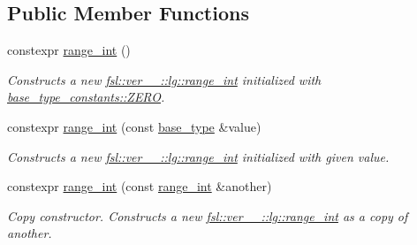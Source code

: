 \subsection*{Public Member Functions}
\begin{DoxyCompactItemize}
\item 
\mbox{\label{classfsl_1_1ver__1__0_1_1lg_1_1range__int_acab1d8507d2ee32ae77216e4900b8ff0}} 
constexpr \mbox{\hyperlink{classfsl_1_1ver__1__0_1_1lg_1_1range__int_acab1d8507d2ee32ae77216e4900b8ff0}{range\+\_\+int}} ()
\begin{DoxyCompactList}\small\item\em Constructs a new \mbox{\hyperlink{classfsl_1_1ver__1__0_1_1lg_1_1range__int}{fsl\+::ver\+\_\+\_\+::lg\+::range\+\_\+int}} initialized with {\itshape \mbox{\hyperlink{structfsl_1_1ver__1__0_1_1lg_1_1range__int_1_1base__type__constants_ada13cd01546095bb61095888cd0ab41d}{base\+\_\+type\+\_\+constants\+::\+Z\+E\+RO}}}. \end{DoxyCompactList}\item 
constexpr \mbox{\hyperlink{classfsl_1_1ver__1__0_1_1lg_1_1range__int_af2d5d7b2a049515ae1411d4a0eb6b528}{range\+\_\+int}} (const \mbox{\hyperlink{classfsl_1_1ver__1__0_1_1lg_1_1range__int_aa6c763f6d72d18c8b9129c0c06628cd3}{base\+\_\+type}} \&value)
\begin{DoxyCompactList}\small\item\em Constructs a new \mbox{\hyperlink{classfsl_1_1ver__1__0_1_1lg_1_1range__int}{fsl\+::ver\+\_\+\_\+::lg\+::range\+\_\+int}} initialized with given {\itshape value}. \end{DoxyCompactList}\item 
\mbox{\label{classfsl_1_1ver__1__0_1_1lg_1_1range__int_aba61ca2b02f80a0f5af9550d9b222d5d}} 
constexpr \mbox{\hyperlink{classfsl_1_1ver__1__0_1_1lg_1_1range__int_aba61ca2b02f80a0f5af9550d9b222d5d}{range\+\_\+int}} (const \mbox{\hyperlink{classfsl_1_1ver__1__0_1_1lg_1_1range__int}{range\+\_\+int}} \&another)
\begin{DoxyCompactList}\small\item\em Copy constructor. Constructs a new \mbox{\hyperlink{classfsl_1_1ver__1__0_1_1lg_1_1range__int}{fsl\+::ver\+\_\+\_\+::lg\+::range\+\_\+int}} as a copy of {\itshape another}. \end{DoxyCompactList}\item 

\end{DoxyCompactItemize}
